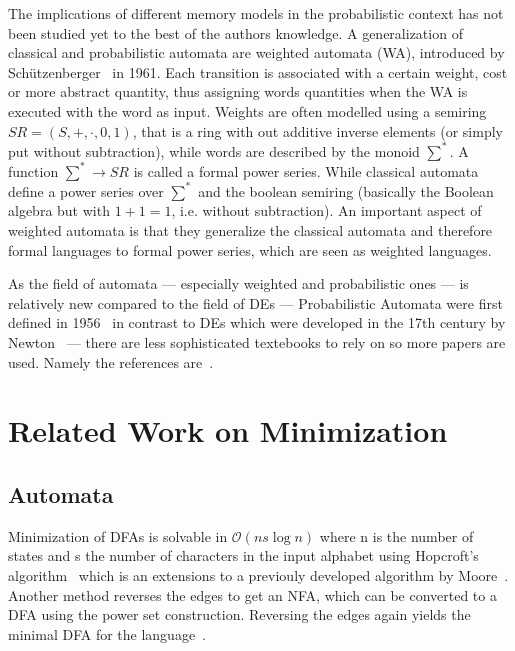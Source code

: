 \documentclass[11pt, rgb]{scrartcl}
\begin{document}
The implications of different memory models in the probabilistic context has not been studied yet to the best of the authors knowledge. 
A generalization of classical and probabilistic automata are weighted automata (WA), introduced by Schützenberger~\autocite{schutz} in 1961. 
Each transition is associated with a certain weight, cost or more abstract quantity, thus assigning words quantities when the WA is executed with the word as input. 
Weights are often modelled using a semiring $SR = (S, +, \cdot, 0, 1)$, that is a ring with out additive inverse elements (or simply put without subtraction), while words are described by the monoid $\sum^*$.
A function $\sum^* \rightarrow SR$ is called a formal power series.
While classical automata define a power series over $\sum^*$ and the boolean semiring (basically the Boolean algebra but with $1+1 = 1$, i.e. without subtraction).
An important aspect of weighted automata is that they generalize the classical automata and therefore formal languages to formal power series, which are seen as weighted languages.

As the field of automata --- especially weighted and probabilistic ones --- is relatively new compared to the field of DEs --- Probabilistic Automata were first defined in 1956~\autocite{automatastudies} in contrast to DEs which were developed in the 17th century by Newton~\autocite{newton} --- there are less sophisticated textebooks to rely on so more papers are used. 
Namely the references are~\cite{sokolova, automatastudies, ppat, ata, hwa, paz, wolf, stoelinga, survey, patypes, pg, rpga, stochsysI, stochsysII, rabin, schoning}.  

\section{Related Work on Minimization}
\subsection{Automata}
Minimization of DFAs is solvable in $\mathcal{O}(ns \log n)$ where n is the number of states and s the number of characters in the input alphabet using Hopcroft's algorithm~\autocite{hopcroft1971n} which is an extensions to a previouly developed algorithm by Moore~\autocite{automatastudies}. 
Another method reverses the edges to get an NFA, which can be converted to a DFA using the power set construction. 
Reversing the edges again yields the minimal DFA for the language~\autocite{brzozowski}. 
\end{document}
